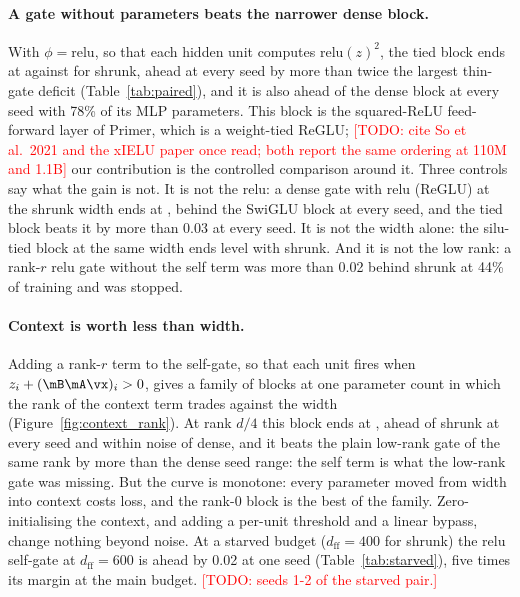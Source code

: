 \documentclass{article}
\newcommand{\todo}[1]{\textcolor{red}{[TODO: #1]}}
\begin{document}
\paragraph{A gate without parameters beats the narrower dense block.} With $\phi = \mathrm{relu}$, so that
each hidden unit computes $\mathrm{relu}(z)^2$, the tied block ends at \meanTiedGateRelu{} against
\meanShrunkRFour{} for shrunk, ahead at every seed by more than twice the largest thin-gate deficit
(Table~\ref{tab:paired}), and it is also ahead of the dense block at every seed with 78\% of its MLP
parameters. This block is the squared-ReLU feed-forward layer of Primer, which is a weight-tied ReGLU;
\todo{cite So et al.\ 2021 and the xIELU paper once read; both report the same ordering at 110M and 1.1B}
our contribution is the controlled comparison around it. Three controls say what the gain is not. It is not
the relu: a dense gate with relu (ReGLU) at the shrunk width ends at \meanShrunkReluRFour{}, behind the SwiGLU
block at every seed, and the tied block beats it by more than 0.03 at every seed. It is not the width alone:
the silu-tied block at the same width ends level with shrunk. And it is not the low rank: a rank-$r$ relu gate
without the self term was more than 0.02 behind shrunk at 44\% of training and was stopped.

\paragraph{Context is worth less than width.} Adding a rank-$r$ term to the self-gate, so that each unit fires
when $z_i + (\mB\mA\vx)_i > 0$, gives a family of blocks at one parameter count in which the rank of the
context term trades against the width (Figure~\ref{fig:context_rank}). At rank $d/4$ this block ends at
\meanThinTiedReluRFour{}, ahead of shrunk at every seed and within noise of dense, and it beats the plain
low-rank gate of the same rank by more than the dense seed range: the self term is what the low-rank gate was
missing. But the curve is monotone: every parameter moved from width into context costs loss, and the rank-0
block is the best of the family. Zero-initialising the context, and adding a per-unit threshold and a linear
bypass, change nothing beyond noise. At a starved budget ($d_{\mathrm{ff}} = 400$ for shrunk) the relu
self-gate at $d_{\mathrm{ff}} = 600$ is ahead by 0.02 at one seed (Table~\ref{tab:starved}), five times its
margin at the main budget. \todo{seeds 1-2 of the starved pair.}
\end{document}
